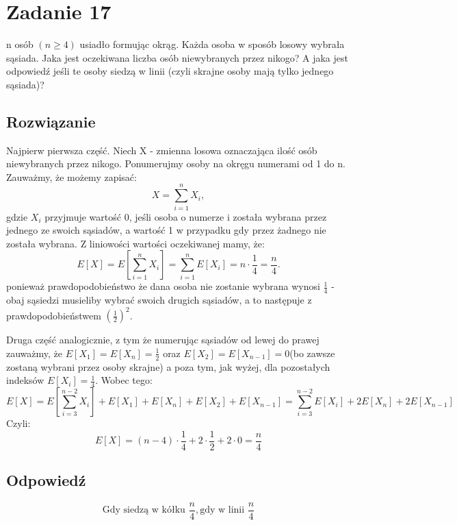 \section{Zadanie 17}
n osób \((n \geq 4)\) usiadło formując okrąg. Każda osoba w sposób losowy
wybrała sąsiada. Jaka jest oczekiwana liczba osób niewybranych przez nikogo? A jaka jest
odpowiedź jeśli te osoby siedzą w linii (czyli skrajne osoby mają tylko jednego sąsiada)?

\subsection*{Rozwiązanie}
Najpierw pierwsza część. Niech X - zmienna losowa oznaczająca ilość osób niewybranych przez nikogo. Ponumerujmy osoby na okręgu numerami od 1 do n. Zauważmy, że możemy zapisać:
\[
	X = \sum\limits_{i=1}^{n} X_i,
\]
gdzie \(X_i\) przyjmuje wartość 0, jeśli osoba o numerze i została wybrana przez jednego ze swoich sąsiadów, a wartość 1 w przypadku gdy przez żadnego nie została wybrana. Z liniowości wartości oczekiwanej mamy, że:
\[
	E[X] = E[\sum\limits_{i=1}^{n} X_i] = \sum\limits_{i=1}^{n} E[X_i] = n \cdot \frac{1}{4} = \frac{n}{4}.
\]
ponieważ prawdopodobieństwo że dana osoba nie zostanie wybrana wynosi \(\frac{1}{4}\) - obaj sąsiedzi musieliby wybrać swoich drugich sąsiadów, a to następuje z prawdopodobieństwem \((\frac{1}{2})^2\).

Druga część analogicznie, z tym że numerując sąsiadów od lewej do prawej zauważmy, że \(E[X_1] = E[X_n] = \frac{1}{2}\) oraz \(E[X_2] = E[X_{n-1}] = 0\)(bo zawsze zostaną wybrani przez osoby skrajne) a poza tym, jak wyżej, dla pozostałych indeksów \(E[X_i] = \frac{1}{4}\). Wobec tego:
\[
	E[X] = E[\sum\limits_{i=3}^{n-2} X_i] + E[X_1] + E[X_n] + E[X_2] + E[X_{n-1}] = \sum\limits_{i=3}^{n-2} E[X_i] + 2E[X_n] + 2E[X_{n-1}]
\]
Czyli:
\[
	E[X] = (n-4) \cdot \frac{1}{4} + 2 \cdot \frac{1}{2} + 2 \cdot 0 = \frac{n}{4}
\]

\subsection*{Odpowiedź}
\[
	\boxed{\text{Gdy siedzą w kółku } \frac{n}{4}, \text{gdy w linii } \frac{n}{4} }
\]
